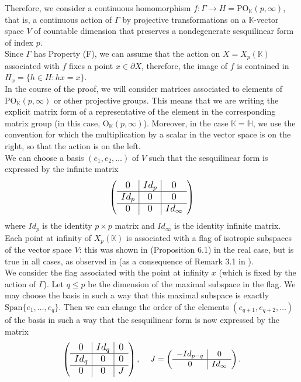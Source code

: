 \documentclass{article}
\theoremstyle{definition}
\theoremstyle{remark}
\theoremstyle{plain}
\begin{document}
Therefore, we consider a continuous homomorphism $f: \Gamma\rightarrow H=\mathrm{PO}_\mathbb{K}(p,\infty)$, that is, a continuous action of $\Gamma$ by projective transformations on a $\mathbb{K}$-vector space $V$ of countable dimension that preserves a nondegenerate sesquilinear form of index $p$. \\

Since $\Gamma$ has Property (F), we can assume that the action on $X=X_p(\mathbb{K})$ associated with $f$ fixes a point $x\in\partial X$, therefore, the image of $f$ is contained in $H_x=\{h\in H: hx=x\}$. \\

In the course of the proof, we will consider matrices associated to elements of $\mathrm{PO}_\mathbb{K}(p,\infty)$ or other projective groups. This means that we are writing the explicit matrix form of a representative of the element in the corresponding matrix group (in this case, $\mathrm{O}_\mathbb{K}(p,\infty)$). Moreover, in the case $\mathbb{K}=\mathbb{H}$, we use the convention for which the multiplication by a scalar in the vector space is on the right, so that the action is on the left.  \\

We can choose a basis $(e_1,e_2,\ldots)$ of $V$ such that the sesquilinear form is expressed by the infinite matrix $$\large \left(\begin{array}{c|c|c}
    0 & Id_p & 0 \\
    \hline
    Id_p & 0 & 0 \\
    \hline
    0 & 0 & Id_\infty
\end{array}\right)$$ where $Id_p$ is the identity $p\times p$ matrix and $Id_\infty$ is the identity infinite matrix. \\

Each point at infinity of $X_p(\mathbb{K})$ is associated with a flag of isotropic subspaces of the vector space $V$: this was shown in \cite{duc2013} (Proposition 6.1) in the real case, but is true in all cases, as observed in \cite{duc2023} (as a consequence of Remark 3.1 in \cite{duc2023}). \\

We consider the flag associated with the point at infinity $x$ (which is fixed by the action of $\Gamma$). Let $q\leq p$ be the dimension of the maximal subspace in the flag. We may choose the basis in such a way that this maximal subspace is exactly $\mathrm{Span}\{e_1,\ldots,e_q\}$. Then we can change the order of the elements $(e_{q+1},e_{q+2},\ldots)$ of the basis in such a way that the sesquilinear form is now expressed by the matrix $$\large\left(\begin{array}{c|c|c}
	0 & Id_q & 0 \\
	\hline
	Id_q & 0 & 0 \\
	\hline
	0 & 0 & \Large J
\end{array}\right),\ \ \ J\normalsize=\left(\begin{array}{c|c}
	-Id_{p-q} & 0 \\
	\hline
	    0 & Id_\infty
\end{array}\right).$$ \\
\end{document}
